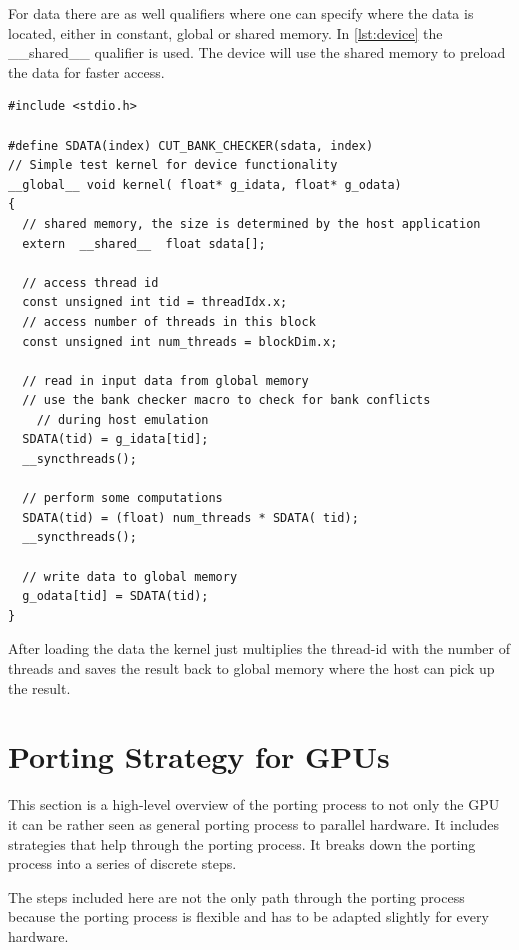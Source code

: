 For data there are as well qualifiers where one can specify where the data is
located, either in constant, global or shared memory. In \autoref{lst:device}
the \textsf{\_\_shared\_\_} qualifier is used. The device will use the shared
memory to preload the data for faster access.

\begin{lstlisting}[caption=CUDA device code, label=lst:device]
#include <stdio.h>

#define SDATA(index) CUT_BANK_CHECKER(sdata, index)
// Simple test kernel for device functionality
__global__ void kernel( float* g_idata, float* g_odata) 
{
  // shared memory, the size is determined by the host application
  extern  __shared__  float sdata[];

  // access thread id 
  const unsigned int tid = threadIdx.x;
  // access number of threads in this block 
  const unsigned int num_threads = blockDim.x;

  // read in input data from global memory
  // use the bank checker macro to check for bank conflicts
 	// during host emulation 
  SDATA(tid) = g_idata[tid];
  __syncthreads();

  // perform some computations 
  SDATA(tid) = (float) num_threads * SDATA( tid);
  __syncthreads();

  // write data to global memory 
  g_odata[tid] = SDATA(tid);
} 
\end{lstlisting} 


After loading the data the kernel just multiplies the thread-id with the number
of threads and saves the result back to global memory where the host can pick up
the result.

\section{Porting Strategy for GPUs}%
\label{sec:porting_strategies_for_gpu} 
This section  is a high-level overview of the porting process to not only
the \gls{GPU} it can be rather seen as general porting process to parallel 
hardware. It includes strategies that help through the porting process. It 
breaks down the porting process into a series of discrete steps. 

The steps included here are not the only path through the porting process because
the porting process is flexible and has to be adapted slightly for every hardware. 

